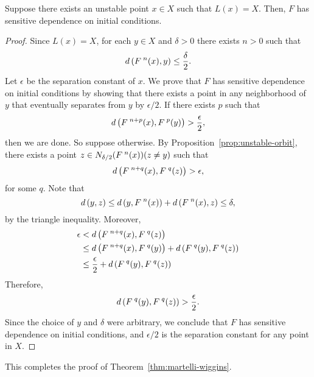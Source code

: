 \documentclass[10pt,draft,twoside]{book}
\begin{document}
\begin{proposition}
  Suppose there exists an unstable point $x \in X$ such that $L(x) = X$.
  Then, $F$ has sensitive dependence on initial conditions.
  \label{prop:martelli-wiggins2}
  \begin{proof}
    Since $L(x) = X$, for each $y\in X$ and $\delta > 0$ there exists $n>0$ such that 
    \begin{equation*}
      d\left( F^{\;n}(x), y \right) \leq \frac{\delta}{2}.
    \end{equation*}
    Let $\epsilon$ be the separation constant of $x$.
    We prove that $F$ has sensitive dependence on initial conditions by showing that there exists a point in any neighborhood of $y$ that eventually separates from $y$ by $\epsilon/2$.
    If there exists $p$ such that 
    \begin{equation*}
      d\left( F^{\;n+p}(x), F^{\;p}(y) \right) > \frac{\epsilon}{2},
    \end{equation*}
    then we are done.
    So suppose otherwise.
    By Proposition~\ref{prop:unstable-orbit}, there exists a point $z \in N_{\delta/2}(F^{\;n}(x)) (z \neq y)$ such that 
    \begin{equation*}
      d\left( F^{\;n+q}(x), F^{\;q}(z) \right) > \epsilon,
    \end{equation*}
    for some $q$.
    Note that
    \begin{equation*}
      d\left( y, z \right) \leq d\left( y, F^{\;n}(x) \right) + d\left( F^{\;n}(x), z \right) \leq \delta,
    \end{equation*}
    by the triangle inequality.
    Moreover,
    \begin{align*}
      \epsilon &< d\left( F^{\;n+q}(x), F^{\;q}(z) \right) \\
      &\leq d\left( F^{\;n+q}(x), F^{\;q}(y) \right) + d\left( F^{\;q}(y), F^{\;q}(z) \right)  \\
      &\leq \frac{\epsilon}{2} + d\left( F^{\;q}(y), F^{\;q}(z) \right)
    \end{align*}
    Therefore,
    \begin{equation*}
      d\left( F^{\;q}(y), F^{\;q}(z) \right) > \frac{\epsilon}{2}.
    \end{equation*}
    Since the choice of $y$ and $\delta$ were arbitrary, we conclude that $F$ has sensitive dependence on initial conditions, and $\epsilon/2$ is the separation constant for any point in $X$.
  \end{proof}
\end{proposition}
This completes the proof of Theorem~\ref{thm:martelli-wiggins}.
\end{document}
